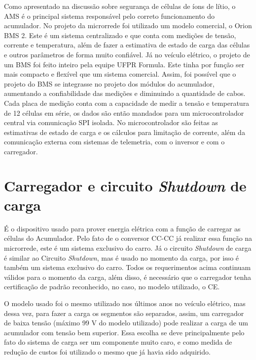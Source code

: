     Como apresentado na discussão sobre segurança de células de íons de lítio, o AMS é o principal sistema responsável pelo correto funcionamento do acumulador. No projeto da microrrede foi utilizado um modelo comercial, o Orion BMS 2. Este é um sistema centralizado e que conta com medições de tensão, corrente e temperatura, além de fazer a estimativa de estado de carga das células e outros parâmetros de forma muito confiável. Já no veículo elétrico, o projeto de um BMS foi feito inteiro pela equipe UFPR Formula. Este tinha por função ser mais compacto e flexível que um sistema comercial. Assim, foi possível que o projeto do BMS se integrasse no projeto dos módulos do acumulador, aumentando a confiabilidade das medições e diminuindo a quantidade de cabos. Cada placa de medição conta com a capacidade de medir a tensão e temperatura de 12 células em série, os dados são então mandados para um microcontrolador central via comunicação SPI isolada. No microcontrolador são feitas as estimativas de estado de carga e os cálculos para limitação de corrente, além da comunicação externa com sistemas de telemetria, com o inversor e com o carregador.


\section{Carregador e circuito \textit{Shutdown} de carga}

    É o dispositivo usado para prover energia elétrica com a função de carregar as células do Acumulador. Pelo fato de o conversor CC-CC já realizar essa função na microrrede, este é um sistema exclusivo do carro. Já o circuito \textit{Shutdown} de carga é similar ao Circuito \textit{Shutdown}, mas é usado no momento da carga, por isso é também um sistema exclusivo do carro. Todos os requerimentos acima continuam válidos para o momento da carga, além disso, é necessário que o carregador tenha certificação de padrão reconhecido, no caso, no modelo utilizado, o CE.

    O modelo usado foi o mesmo utilizado nos últimos anos no veículo elétrico, mas dessa vez, para fazer a carga os segmentos são separados, assim, um carregador de baixa tensão (máximo 99 V do modelo utilizado) pode realizar a carga de um acumulador com tensão bem superior. Essa escolha se deve principalmente pelo fato do sistema de carga ser um componente muito caro, e como medida de redução de custos foi utilizado o mesmo que já havia sido adquirido.